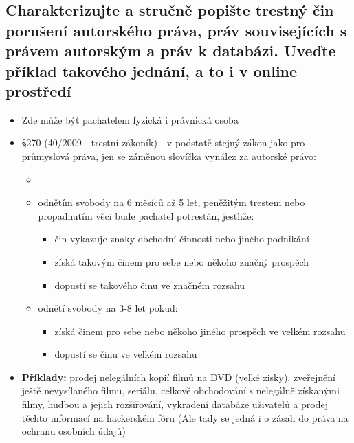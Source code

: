 \subsection{Charakterizujte a stručně popište trestný čin porušení autorského práva, práv souvisejících s právem autorským a práv k databázi. Uveďte příklad takového jednání, a to i v online prostředí}
\begin{itemize}
    \item Zde může být pachatelem fyzická i právnická osoba
    \item §270 (40/2009 - trestní zákoník) - v podstatě stejný zákon jako pro
    průmyslová práva, jen se záměnou slovíčka vynález za autorské právo:
    \begin{itemize}
        \item {}
        \item odnětím svobody na 6 měsíců až 5 let, peněžitým trestem nebo
        propadnutím věci bude pachatel potrestán, jestliže:
        \begin{itemize}
            \item čin vykazuje znaky obchodní činnosti nebo jiného podnikání
            \item získá takovým činem pro sebe nebo někoho značný prospěch
            \item dopustí se takového činu ve značném rozsahu
        \end{itemize}
        \item odnětí svobody na 3-8 let pokud:
        \begin{itemize}
            \item získá činem pro sebe nebo někoho jiného prospěch ve velkém
            rozsahu
            \item dopustí se činu ve velkém rozsahu
        \end{itemize}
    \end{itemize}
    \item \textbf{Příklady:} prodej nelegálních kopií filmů na DVD (velké zisky), zveřejnění ještě
    nevysílaného filmu, seriálu, celkově obchodování s nelegálně získanými
    filmy, hudbou a jejich rozšiřování, vykradení databáze uživatelů a prodej těchto informací na hackerském fóru (Ale tady se jedná i o zásah do práva na ochranu osobních údajů)
\end{itemize}
